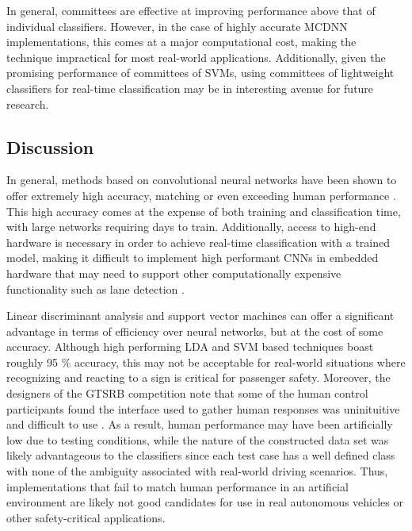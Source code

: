 \documentclass[letterpaper,twocolumn,10pt]{article}
\begin{document}
In general, committees are effective at improving performance above that of individual classifiers. However, in the case of highly accurate MCDNN implementations, this comes at a major computational cost, making the technique impractical for most real-world applications. Additionally, given the promising performance of committees of SVMs, using committees of lightweight classifiers for real-time classification may be in interesting avenue for future research.

\subsection{Discussion}

In general, methods based on convolutional neural networks have been shown to offer extremely high accuracy, matching or even exceeding human performance \cite{ciresan_committee_2011, ciresan_multi-column_2012, sermanet_convolutional_2012, sermanet_traffic_2011}. This high accuracy comes at the expense of both training and classification time, with large networks requiring days to train. Additionally, access to high-end hardware is necessary in order to achieve real-time classification with a trained model, making it difficult to implement high performant CNNs in embedded hardware that may need to support other computationally expensive functionality such as lane detection \cite{ciresan_committee_2011, ciresan_multi-column_2012, lane-detection}.

Linear discriminant analysis and support vector machines can offer a significant advantage in terms of efficiency over neural networks, but at the cost of some accuracy. Although high performing LDA and SVM based techniques boast roughly 95 \% accuracy, this may not be acceptable for real-world situations where recognizing and reacting to a sign is critical for passenger safety. Moreover, the designers of the GTSRB competition note that some of the human control participants found the interface used to gather human responses was uninituitive and difficult to use \cite{stallkamp_german_2011, stallkamp_man_2012}. As a result, human performance may have been artificially low due to testing conditions, while the nature of the constructed data set was likely advantageous to the classifiers since each test case has a well defined class with none of the ambiguity associated with real-world driving scenarios. Thus, implementations that fail to match human performance in an artificial environment are likely not good candidates for use in real autonomous vehicles or other safety-critical applications.
\end{document}

